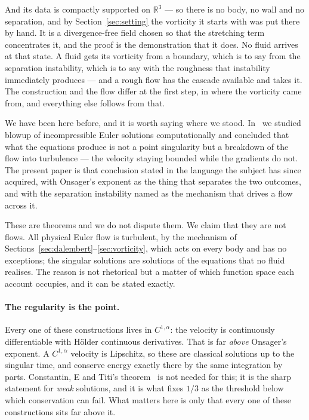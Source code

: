 \documentclass[11pt]{article}
\begin{document}
And its data is compactly supported on $\mathbb{R}^3$ --- so there is no body, no wall and no
separation, and by Section~\ref{sec:setting} the vorticity it starts with was put there by hand. It
is a divergence-free field chosen so that the stretching term concentrates it, and the proof is the
demonstration that it does. No fluid arrives at that state. A fluid gets its vorticity from a
boundary, which is to say from the separation instability, which is to say with the roughness that
instability immediately produces --- and a rough flow has the cascade available and takes it. The
construction and the flow differ at the first step, in where the vorticity came from, and everything
else follows from that.

We have been here before, and it is worth saying where we stood. In~\cite{blowupHJ} we studied
blowup of incompressible Euler solutions computationally and concluded that what the equations
produce is not a point singularity but a breakdown of the flow into turbulence --- the velocity
staying bounded while the gradients do not. The present paper is that conclusion stated in the
language the subject has since acquired, with Onsager's exponent as the thing that separates the two
outcomes, and with the separation instability named as the mechanism that drives a flow across it.

These are theorems and we do not dispute them. We claim that they are not flows. All physical
Euler flow is turbulent, by the mechanism of Sections~\ref{sec:dalembert}--\ref{sec:vorticity},
which acts on every body and has no exceptions; the singular solutions are solutions of the
equations that no fluid realises. The reason is not rhetorical but a matter of which function space
each account occupies, and it can be stated exactly.

\paragraph{The regularity is the point.} Every one of these constructions lives in $C^{1,\alpha}$:
the velocity is continuously differentiable with H\"older continuous derivatives. That is far
\emph{above} Onsager's exponent. A $C^{1,\alpha}$ velocity is Lipschitz, so these are classical
solutions up to the singular time, and conserve energy exactly there by the same integration by
parts. Constantin, E and Titi's theorem~\cite{cet} is not needed for this; it is the sharp statement
for \emph{weak} solutions, and it is what fixes $1/3$ as the threshold below which conservation can
fail. What matters here is only that every one of these constructions sits far above it.
\end{document}
